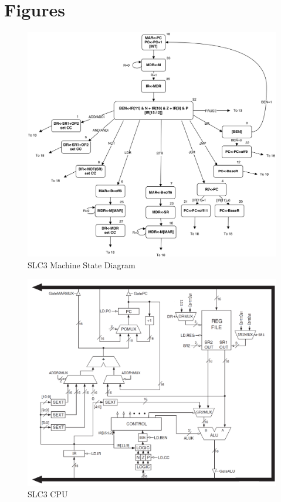 \documentclass[journal, twocolumn, final,11pt,letterpaper]{IEEEtran}
\begin{document}
\clearpage
\onecolumn
\section{Figures}

\begin{figure} [htbp]
	\centering	
	\includegraphics[scale=0.7]{state-diagram.png}
	\caption{SLC3 Machine State Diagram	\label{fig:state-diagram}}
\end{figure}


\begin{figure} [htbp]
	\centering
	\includegraphics[scale=0.27]{SLC3_Circuit.png}
	\caption{SLC3 CPU \label{fig:SLC3-Circuit}}
\end{figure}
\end{document}
